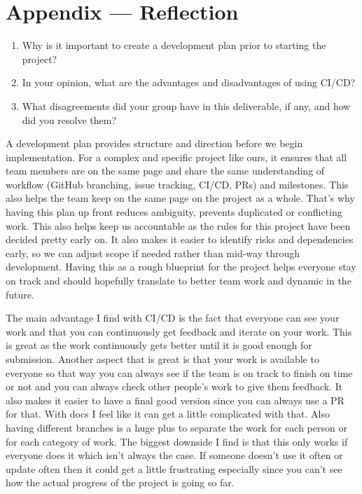 \documentclass{article}
\begin{document}
\newpage{}

\section*{Appendix --- Reflection}




\begin{enumerate}
    \item Why is it important to create a development plan prior to starting the
    project?
    \item In your opinion, what are the advantages and disadvantages of using
    CI/CD?
    \item What disagreements did your group have in this deliverable, if any,
    and how did you resolve them?
\end{enumerate}


\hspace{2em} A development plan provides structure and direction before we begin implementation. For a complex and specific project like ours, it ensures that all team members are on the same page and share the same understanding of workflow (GitHub branching, issue tracking, CI/CD, PRs) and milestones. This also helps the team keep on the same page on the project as a whole. That’s why having this plan up front reduces ambiguity, prevents duplicated or conflicting work. This also helps keep us accountable as the rules for this project have been decided pretty early on. It also makes it easier to identify risks and dependencies early, so we can adjust scope if needed rather than mid-way through development. Having this as a rough blueprint for the project helps everyone stay on track and should hopefully translate to better team work and dynamic in the future.

\hspace{2em} The main advantage I find with CI/CD is the fact that everyone can see your work and that you can continuously get feedback and iterate on your work. This is great as the work continuously gets better until it is good enough for submission. Another aspect that is great is that your work is available to everyone so that way you can always see if the team is on track to finish on time or not and you can always check other people’s work to give them feedback. It also makes it easier to have a final good version since you can always use a PR for that. With docs I feel like it can get a little complicated with that. Also having different branches is a huge plus to separate the work for each person or for each category of work. The biggest downside I find is that this only works if everyone does it which isn’t always the case. If someone doesn’t use it often or update often then it could get a little frustrating especially since you can’t see how the actual progress of the project is going so far.
\end{document}
